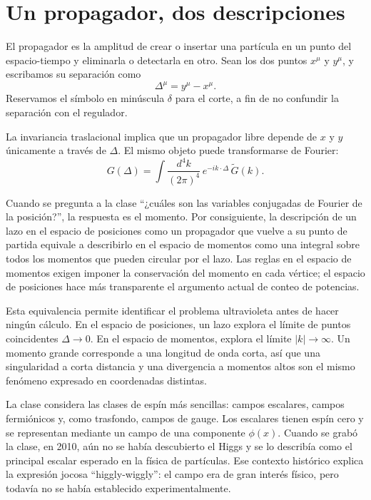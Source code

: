 \section{Un propagador, dos descripciones}

El propagador es la amplitud de crear o insertar una partícula en un punto del espacio-tiempo y eliminarla o detectarla en otro. Sean los dos puntos \(x^\mu\) y \(y^\mu\), y escribamos su separación como
\begin{equation}
\Delta^\mu=y^\mu-x^\mu.
\end{equation}
Reservamos el símbolo en minúscula \(\delta\) para el corte, a fin de no confundir la separación con el regulador.

La invariancia traslacional implica que un propagador libre depende de \(x\) y \(y\) únicamente a través de \(\Delta\). El mismo objeto puede transformarse de Fourier:
\begin{equation}
G(\Delta)
=\int\frac{d^4k}{(2\pi)^4}\,e^{-ik\cdot\Delta}\,\widetilde G(k).
\end{equation}

Cuando se pregunta a la clase ``¿cuáles son las variables conjugadas de Fourier de la posición?'', la respuesta es el momento. Por consiguiente, la descripción de un lazo en el espacio de posiciones como un propagador que vuelve a su punto de partida equivale a describirlo en el espacio de momentos como una integral sobre todos los momentos que pueden circular por el lazo. Las reglas en el espacio de momentos exigen imponer la conservación del momento en cada vértice; el espacio de posiciones hace más transparente el argumento actual de conteo de potencias.

Esta equivalencia permite identificar el problema ultravioleta antes de hacer ningún cálculo. En el espacio de posiciones, un lazo explora el límite de puntos coincidentes \(\Delta\to0\). En el espacio de momentos, explora el límite \(|k|\to\infty\). Un momento grande corresponde a una longitud de onda corta, así que una singularidad a corta distancia y una divergencia a momentos altos son el mismo fenómeno expresado en coordenadas distintas.

La clase considera las clases de espín más sencillas: campos escalares, campos fermiónicos y, como trasfondo, campos de gauge. Los escalares tienen espín cero y se representan mediante un campo de una componente \(\phi(x)\). Cuando se grabó la clase, en 2010, aún no se había descubierto el Higgs y se lo describía como el principal escalar esperado en la física de partículas. Ese contexto histórico explica la expresión jocosa ``higgly-wiggly'': el campo era de gran interés físico, pero todavía no se había establecido experimentalmente.

